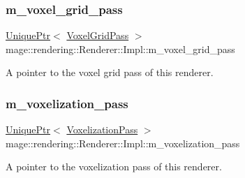 \subsubsection{\texorpdfstring{m\+\_\+voxel\+\_\+grid\+\_\+pass}{m\_voxel\_grid\_pass}}
{\footnotesize\ttfamily \hyperlink{namespacemage_a3316d7143a973e37adf1110f2e80ca31}{Unique\+Ptr}$<$ \hyperlink{classmage_1_1rendering_1_1_voxel_grid_pass}{Voxel\+Grid\+Pass} $>$ mage\+::rendering\+::\+Renderer\+::\+Impl\+::m\+\_\+voxel\+\_\+grid\+\_\+pass\hspace{0.3cm}{\ttfamily [private]}}

A pointer to the voxel grid pass of this renderer. \hypertarget{classmage_1_1rendering_1_1_renderer_1_1_impl_a1701b11fe9fe100a033920b6e8617adb}{}\label{classmage_1_1rendering_1_1_renderer_1_1_impl_a1701b11fe9fe100a033920b6e8617adb} 
\subsubsection{\texorpdfstring{m\+\_\+voxelization\+\_\+pass}{m\_voxelization\_pass}}
{\footnotesize\ttfamily \hyperlink{namespacemage_a3316d7143a973e37adf1110f2e80ca31}{Unique\+Ptr}$<$ \hyperlink{classmage_1_1rendering_1_1_voxelization_pass}{Voxelization\+Pass} $>$ mage\+::rendering\+::\+Renderer\+::\+Impl\+::m\+\_\+voxelization\+\_\+pass\hspace{0.3cm}{\ttfamily [private]}}

A pointer to the voxelization pass of this renderer. 